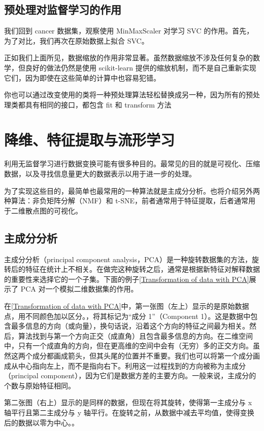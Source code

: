 \subsection{预处理对监督学习的作用}

我们回到 cancer 数据集，观察使用 MinMaxScaler 对学习 SVC 的作用。首先，为了对比，我们再次在原始数据上拟合 SVC。

正如我们上面所见，数据缩放的作用非常显著。虽然数据缩放不涉及任何复杂的数学，但良好的做法仍然是使用 scikit-learn 提供的缩放机制，而不是自己重新实现它们，因为即使在这些简单的计算中也容易犯错。

你也可以通过改变使用的类将一种预处理算法轻松替换成另一种，因为所有的预处理类都具有相同的接口，都包含 fit 和 transform 方法
\section{降维、特征提取与流形学习}
利用无监督学习进行数据变换可能有很多种目的。最常见的目的就是可视化、压缩数据，以及寻找信息量更大的数据表示以用于进一步的处理。

为了实现这些目的，最简单也最常用的一种算法就是主成分分析。也将介绍另外两种算法：非负矩阵分解（NMF）和 t-SNE，前者通常用于特征提取，后者通常用于二维散点图的可视化。
\subsection{主成分分析}
主成分分析（principal component analysis，PCA）是一种旋转数据集的方法，旋转后的特征在统计上不相关。在做完这种旋转之后，通常是根据新特征对解释数据的重要性来选择它的一个子集。下面的例子\autoref{Transformation of data with PCA}展示了 PCA 对一个模拟二维数据集的作用。


在\autoref{Transformation of data with PCA}中，第一张图（左上）显示的是原始数据点，用不同颜色加以区分。，将其标记为“成分 1”（Component 1）。这是数据中包含最多信息的方向（或向量），换句话说，沿着这个方向的特征之间最为相关。然后，算法找到与第一个方向正交（成直角）且包含最多信息的方向。在二维空间中，只有一个成直角的方向，但在更高维的空间中会有（无穷）多的正交方向。虽然这两个成分都画成箭头，但其头尾的位置并不重要。我们也可以将第一个成分画成从中心指向左上，而不是指向右下。利用这一过程找到的方向被称为主成分（principal component），因为它们是数据方差的主要方向。一般来说，主成分的个数与原始特征相同。

第二张图（右上）显示的是同样的数据，但现在将其旋转，使得第一主成分与 x 轴平行且第二主成分与 y 轴平行。在旋转之前，从数据中减去平均值，使得变换后的数据以零为中心。。

